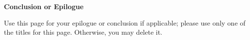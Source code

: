 
\begin{center}
\pagebreak
\vspace*{5\baselineskip}
\textbf{\large Conclusion or Epilogue}
\end{center}


\begin{flushleft}
\hspace{10mm}Use this page for your epilogue or conclusion if applicable; please use only one of the titles for this page. Otherwise, you may delete it.
\end{flushleft}




